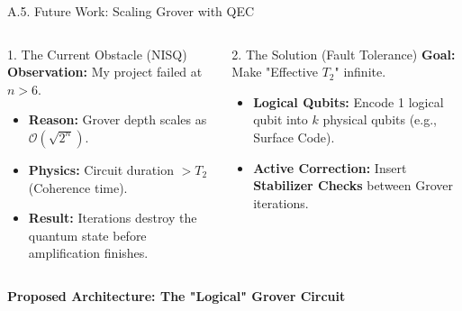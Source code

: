 \documentclass[aspectratio=169, 10pt]{beamer}
\begin{document}
\begin{frame}{A.5. Future Work: Scaling Grover with QEC}
    \begin{columns}[t]
        \begin{block}{1. The Current Obstacle (NISQ)}
            \textbf{Observation:} My project failed at $n > 6$.
            \begin{itemize}
                \item \textbf{Reason:} Grover depth scales as $\mathcal{O}(\sqrt{2^n})$.
                \item \textbf{Physics:} Circuit duration $> T_2$ (Coherence time).
                \item \textbf{Result:} Iterations destroy the quantum state before amplification finishes.
            \end{itemize}
        \end{block}

        \begin{exampleblock}{2. The Solution (Fault Tolerance)}
            \textbf{Goal:} Make "Effective $T_2$" infinite.
            \begin{itemize}
                \item \textbf{Logical Qubits:} Encode 1 logical qubit into $k$ physical qubits (e.g., Surface Code).
                \item \textbf{Active Correction:} Insert \textbf{Stabilizer Checks} between Grover iterations.
            \end{itemize}
        \end{exampleblock}
    \end{columns}

    \vspace{0.3cm}

    \centering
    \textbf{Proposed Architecture: The "Logical" Grover Circuit}
    
\end{frame}
\end{document}
